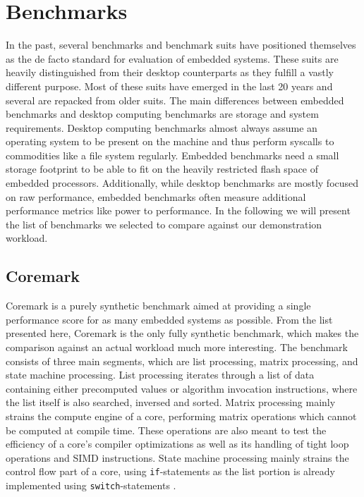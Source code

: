 \documentclass[../bachelor_paper.tex]{subfiles}
\begin{document}
\chapter{Benchmarks}
    \label{ch:bench}

In the past, several benchmarks and benchmark suits have positioned themselves as the de facto standard for evaluation of embedded systems. These suits are heavily distinguished from their desktop counterparts as they fulfill a vastly different purpose. Most of these suits have emerged in the last 20 years and several are repacked from older suits. The main differences between embedded benchmarks and desktop computing benchmarks are storage and system requirements. Desktop computing benchmarks almost always assume an operating system to be present on the machine and thus perform syscalls to commodities like a file system regularly. Embedded benchmarks need a small storage footprint to be able to fit on the heavily restricted flash space of embedded processors. Additionally, while desktop benchmarks are mostly focused on raw performance, embedded benchmarks often measure additional performance metrics like power to performance. In the following we will present the list of benchmarks we selected to compare against our demonstration workload.

\section{Coremark}
Coremark is a purely synthetic benchmark aimed at providing a single performance score for as many embedded systems as possible. From the list presented here, Coremark is the only fully synthetic benchmark, which makes the comparison against an actual workload much more interesting. The benchmark consists of three main segments, which are list processing, matrix processing, and state machine processing. List processing iterates through a list of data containing either precomputed values or algorithm invocation instructions, where the list itself is also searched, inversed and sorted. Matrix processing mainly strains the compute engine of a core, performing matrix operations which cannot be computed at compile time. These operations are also meant to test the efficiency of a core's compiler optimizations as well as its handling of tight loop operations and \ac{SIMD} instructions. State machine processing mainly strains the control flow part of a core, using \texttt{if}-statements as the list portion is already implemented using \texttt{switch}-statements \cite{gal-onExploringCoremarkBenchmark2012}.
\end{document}
